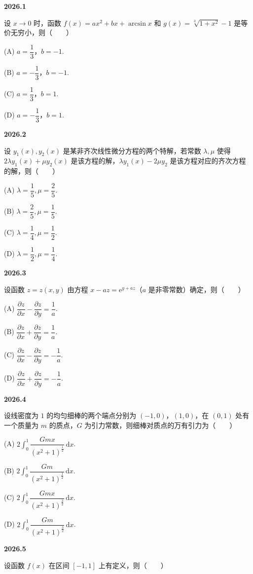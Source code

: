 \documentclass[UTF8,12pt,fontset=windows]{ctexart}
\begin{document}
{\large\bfseries 2026.1}

设 $x\to0$ 时，函数 $f(x)=ax^2+bx+\arcsin x$ 和 $g(x)=\sqrt[3]{1+x^2}-1$ 是等价无穷小，则（　　）

(A) $a=\dfrac13$，$b=-1$.

(B) $a=-\dfrac13$，$b=-1$.

(C) $a=\dfrac13$，$b=1$.

(D) $a=-\dfrac13$，$b=1$.

\vfill
\newpage
{\large\bfseries 2026.2}

设 $y_1(x),y_2(x)$ 是某非齐次线性微分方程的两个特解，若常数 $\lambda,\mu$ 使得 $2\lambda y_1(x)+\mu y_2(x)$ 是该方程的解，$\lambda y_1(x)-2\mu y_2$ 是该方程对应的齐次方程的解，则（　　）

(A) $\lambda=\dfrac15,\mu=\dfrac25$.

(B) $\lambda=\dfrac25,\mu=\dfrac15$.

(C) $\lambda=\dfrac14,\mu=\dfrac12$.

(D) $\lambda=\dfrac12,\mu=\dfrac14$.

\vfill
\newpage
{\large\bfseries 2026.3}

设函数 $z=z(x,y)$ 由方程 $x-az=\mathrm{e}^{y+az}$（$a$ 是非零常数）确定，则（　　）

(A) $\dfrac{\partial z}{\partial x}-\dfrac{\partial z}{\partial y}=\dfrac1a$.

(B) $\dfrac{\partial z}{\partial x}+\dfrac{\partial z}{\partial y}=\dfrac1a$.

(C) $\dfrac{\partial z}{\partial x}-\dfrac{\partial z}{\partial y}=-\dfrac1a$.

(D) $\dfrac{\partial z}{\partial x}+\dfrac{\partial z}{\partial y}=-\dfrac1a$.

\vfill
\newpage
{\large\bfseries 2026.4}

设线密度为 $1$ 的均匀细棒的两个端点分别为 $(-1,0)$，$(1,0)$，在 $(0,1)$ 处有一个质量为 $m$ 的质点，$G$ 为引力常数，则细棒对质点的万有引力为（　　）

(A) $2\displaystyle\int_0^1\dfrac{Gmx}{(x^2+1)^{\frac12}}\,\mathrm{d}x$.

(B) $2\displaystyle\int_0^1\dfrac{Gm}{(x^2+1)^{\frac12}}\,\mathrm{d}x$.

(C) $2\displaystyle\int_0^1\dfrac{Gmx}{(x^2+1)^{\frac32}}\,\mathrm{d}x$.

(D) $2\displaystyle\int_0^1\dfrac{Gm}{(x^2+1)^{\frac32}}\,\mathrm{d}x$.

\vfill
\newpage
{\large\bfseries 2026.5}

设函数 $f(x)$ 在区间 $[-1,1]$ 上有定义，则（　　）
\end{document}
